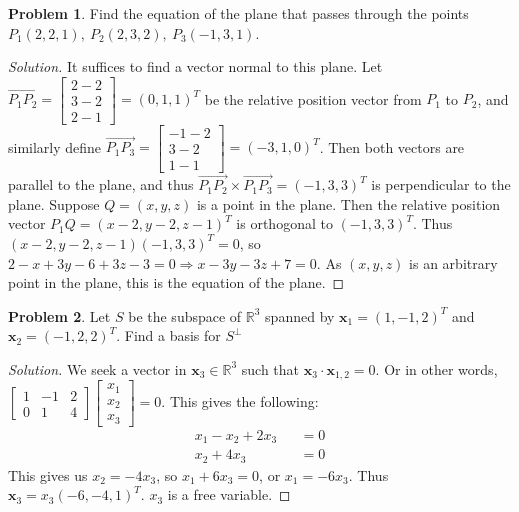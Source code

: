 \documentclass[oneside]{book}
\theoremstyle{definition}
\newtheorem{problem}{Problem}[section]
\newcommand*\B[1]{\mathbf{#1}}
\begin{document}
\begin{problem}
Find the equation of the plane that passes through the points $P_1(2,2,1),\ P_2(2,3,2),\ P_3(-1,3,1)$.
\end{problem}
\begin{proof}[Solution]
It suffices to find a vector normal to this plane. Let $\overrightarrow{P_1P_2} = \begin{bmatrix} 2-2 \\ 3-2 \\ 2-1 \end{bmatrix} = (0,1,1)^T$ be the relative position vector from $P_1$ to $P_2$, and similarly define $\overrightarrow{P_1P_3} = \begin{bmatrix} -1-2 \\ 3-2 \\ 1-1 \end{bmatrix} = (-3,1,0)^T$. Then both vectors are parallel to the plane, and thus $\overrightarrow{P_1P_2}\times \overrightarrow{P_1P_3}=(-1,3,3)^T$ is perpendicular to the plane. Suppose $Q=(x,y,z)$ is a point in the plane. Then the relative position vector $P_1 Q = (x-2,y-2,z-1)^T$ is orthogonal to $(-1,3,3)^T$. Thus $(x-2,y-2,z-1)(-1,3,3)^T = 0$, so $2-x+3y-6+3z-3 = 0 \Rightarrow x-3y-3z +7 = 0$. As $(x,y,z)$ is an arbitrary point in the plane, this is the equation of the plane.
\end{proof}

\begin{problem}
Let $S$ be the subspace of $\mathbb{R}^3$ spanned by $\B{x}_1 = (1,-1,2)^T$ and $\B{x}_2 = (-1,2,2)^T$. Find a basis for $S^{\perp}$
\end{problem}
\begin{proof}[Solution]
We seek a vector in $\B{x}_3\in\mathbb{R}^3$ such that $\B{x}_3\cdot \B{x}_{1,2} = 0$. Or in other words, $\begin{bmatrix} 1 & -1 & 2 \\ 0 & 1 & 4 \end{bmatrix} \begin{bmatrix} x_1 \\ x_2 \\ x_3 \end{bmatrix} = 0$. This gives the following:
\begin{eqnarray}
x_1 - x_2 + 2x_3 &&= 0\\
	x_2 + 4x_3 &&= 0
\end{eqnarray}
This gives us $x_2 = -4x_3$, so $x_1 + 6x_3 = 0$, or $x_1=-6x_3$. Thus $\B{x}_3 = x_3(-6,-4,1)^T$. $x_3$ is a free variable.
\end{proof}
\end{document}
